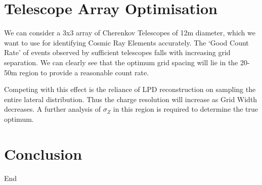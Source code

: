 \documentclass{article}
\begin{document}
\section{Telescope Array Optimisation}

We can consider a 3x3 array of Cherenkov Telescopes of 12m diameter, which we want to use for identifying Cosmic Ray Elements accurately. The \textquoteleft Good Count Rate' of events observed by sufficient telescopes falls with increasing grid separation. We can clearly see that the optimum grid spacing will lie in the 20-50m region to provide a reasonable count rate.

Competing with this effect is the reliance of LPD reconstruction on sampling the entire lateral distribution. Thus the charge resolution will increase as Grid Width decreases. A further analysis of $\sigma_{Z}$ in this region is required to determine the true optimum.

\section{Conclusion}
End


\end{document}
